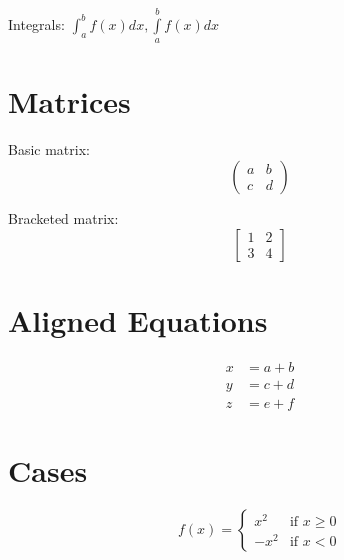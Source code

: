 \documentclass{article}
\begin{document}
Integrals:
$\int_{a}^{b} f(x) dx, \int\limits_{a}^{b} f(x) dx$

\section{Matrices}
Basic matrix:
\[
\begin{pmatrix}
a & b \\
c & d
\end{pmatrix}
\]

Bracketed matrix:
\[
\begin{bmatrix}
1 & 2 \\
3 & 4
\end{bmatrix}
\]

\section{Aligned Equations}
\begin{align}
x &= a + b \\
y &= c + d \\
z &= e + f
\end{align}

\section{Cases}
\[
f(x) = \begin{cases}
x^2 & \text{if } x \geq 0 \\
-x^2 & \text{if } x < 0
\end{cases}
\]
\end{document}
